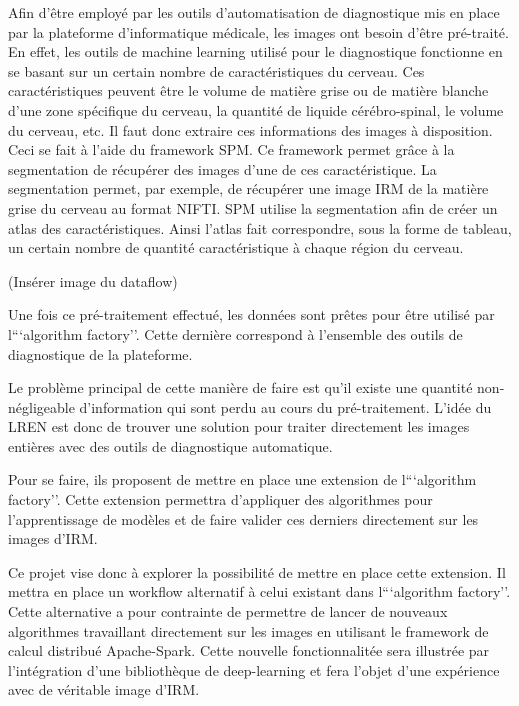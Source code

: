 \documentclass[a4paper,10pt,openany,oneside]{sphinxmanual}
\begin{document}
Afin d'être employé par les outils d'automatisation de diagnostique mis en place par la plateforme d'informatique médicale,
les images ont besoin d'être pré-traité. En effet, les outils de machine learning utilisé pour le diagnostique fonctionne
en se basant sur un certain nombre de caractéristiques du cerveau. Ces caractéristiques peuvent être le volume de matière
grise ou de matière blanche d'une zone spécifique du cerveau, la quantité de liquide cérébro-spinal, le volume du cerveau, etc.
Il faut donc extraire ces informations des images à disposition. Ceci se fait à l'aide du framework SPM. Ce framework permet
grâce à la segmentation de récupérer des images d'une de ces caractéristique. La segmentation permet, par exemple, de récupérer
une image IRM de la matière grise du cerveau au format NIFTI. SPM utilise la segmentation afin de créer un atlas des caractéristiques.
Ainsi l'atlas fait correspondre, sous la forme de tableau, un certain nombre de quantité caractéristique à chaque région du cerveau.

(Insérer image du dataflow)

Une fois ce pré-traitement effectué, les données sont prêtes pour être utilisé par l```algorithm factory''. Cette dernière correspond
à l'ensemble des outils de diagnostique de la plateforme.

Le problème principal de cette manière de faire est qu'il existe une quantité non-négligeable d'information qui sont perdu au cours
du pré-traitement. L'idée du LREN est donc de trouver une solution pour traiter directement les images entières avec des outils de
diagnostique automatique.

Pour se faire, ils proposent de mettre en place une extension de l```algorithm factory''. Cette extension permettra d'appliquer des algorithmes
pour l'apprentissage de modèles et de faire valider ces derniers directement sur les images d'IRM.

Ce projet vise donc à explorer la possibilité de mettre en place cette extension. Il mettra en place un workflow alternatif à celui
existant dans l```algorithm factory''. Cette alternative a pour contrainte de permettre de lancer de nouveaux algorithmes travaillant
directement sur les images en utilisant le framework de calcul distribué Apache-Spark. Cette nouvelle fonctionnalitée sera illustrée
par l'intégration d'une bibliothèque de deep-learning et fera l'objet d'une expérience avec de véritable image d'IRM.
\end{document}
